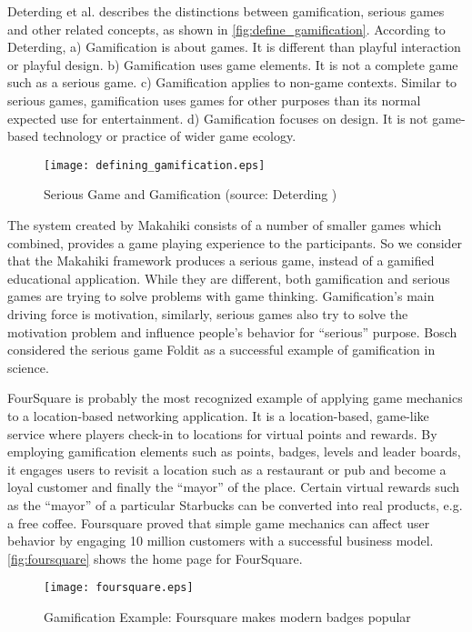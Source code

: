 Deterding et al. \cite{Deterding2011mt} describes the distinctions between gamification, serious games and other related concepts, as shown in \autoref{fig:define_gamification}. According to Deterding, a) Gamification is about games. It is different than playful interaction or playful design. b) Gamification uses game elements. It is not a complete game such as a serious game. c) Gamification applies to non-game contexts. Similar to serious games, gamification uses games for other purposes than its normal expected use for entertainment. d) Gamification focuses on design. It is not game-based technology or practice of wider game ecology.

\begin{figure}[ht!]
	\centering
		\texttt{[image: defining\_gamification.eps]}
		\caption{Serious Game and Gamification (source: Deterding \cite{Deterding2011mt})}
		\label{fig:define_gamification}
\end{figure}

The system created by Makahiki consists of a number of smaller games which combined,  provides a game playing experience to the participants. So we consider that the Makahiki framework produces a serious game, instead of a gamified educational application. While they are different, both gamification and serious games are trying to solve problems with game thinking. Gamification's main driving force is motivation, similarly, serious games also try to solve the motivation problem and influence people's behavior for ``serious'' purpose.  Bosch \cite{bosch2011} considered the serious game Foldit as a successful example of gamification in science. 

FourSquare \cite{foursquare} is probably the most recognized example of applying game mechanics to a location-based networking application. It is a location-based, game-like service where players check-in to locations for virtual points and rewards.  By employing gamification elements such as points, badges, levels and leader boards, it engages users to revisit a location such as a restaurant or pub and become a loyal customer and finally the ``mayor'' of the place. Certain virtual rewards such as the ``mayor'' of a particular Starbucks can be converted into real products, e.g. a free coffee. Foursquare proved that simple game mechanics can affect user behavior by engaging 10 million customers with a successful business model. \autoref{fig:foursquare} shows the home page for FourSquare.

\begin{figure}[ht!]
	\centering
		\texttt{[image: foursquare.eps]}
		\caption{Gamification Example: Foursquare makes modern badges popular\cite{foursquare}}
		\label{fig:foursquare}
\end{figure}

